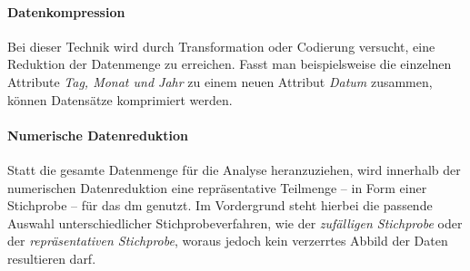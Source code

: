 \paragraph{Datenkompression}
\label{datenkompression}
Bei dieser Technik wird durch Transformation oder Codierung versucht, eine Reduktion der Datenmenge zu erreichen. Fasst man beispielsweise die einzelnen Attribute \textit{Tag, Monat und Jahr} zu einem neuen Attribut \textit{Datum} zusammen, können Datensätze komprimiert werden.
 
\paragraph{Numerische Datenreduktion}
Statt die gesamte Datenmenge für die Analyse heranzuziehen, wird innerhalb der numerischen Datenreduktion eine repräsentative Teilmenge -- in Form einer Stichprobe -- für das \gls{dm} genutzt. Im Vordergrund steht hierbei die passende Auswahl unterschiedlicher Stichprobeverfahren, wie der \textit{zufälligen Stichprobe} oder der \textit{repräsentativen Stichprobe}, woraus jedoch kein verzerrtes Abbild der Daten resultieren darf.